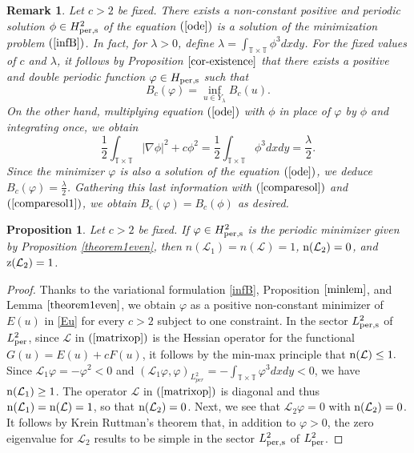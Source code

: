 \documentclass[12pt,reqno,a4paper]{amsart} %
\numberwithin{equation}{section}
\numberwithin{figure}{section}
\newtheorem{proposition}[theorem]{Proposition}
\newtheorem{remark}[theorem]{Remark}
\begin{document}
\begin{remark}\label{remark3} Let $c>2$ be fixed. There exists a non-constant positive and periodic solution $\phi\in H_{\rm per,s}^2$ of the equation $(\ref{ode})$ is a solution of the minimization problem $(\ref{infB})$. In fact, for $\lambda>0$, define $\lambda=\int_{\mathbb{T}\times\mathbb{T}}\phi^3dxdy$. For the fixed values of $c$ and $\lambda$, it follows by Proposition $\ref{cor-existence}$ that there exists a positive and double periodic function $\varphi\in H_{\rm per,s}$ such that 
	\begin{equation}\label{comparesol}
		B_{c}(\varphi)=\inf_{u\in Y_{\lambda}}B_c(u).
		\end{equation}
	On the other hand, multiplying equation $(\ref{ode})$ with $\phi$ in place of $\varphi$ by $\phi$ and integrating once, we obtain
	\begin{equation}\label{comparesol1}
		\frac{1}{2}\int_{\mathbb{T}\times\mathbb{T}}|\nabla \phi|^2+c\phi^2=\frac{1}{2}\int_{\mathbb{T}\times\mathbb{T}}\phi^3dxdy=\frac{\lambda}{2}.
		\end{equation}
		Since the minimizer $\varphi$ is also a solution of the equation $(\ref{ode})$, we deduce $B_{c}(\varphi)=\frac{\lambda}{2}$. Gathering this last information with $(\ref{comparesol})$ and $(\ref{comparesol1})$, we obtain $B_{c}(\varphi)=B_{c}(\phi)$ as desired.
\end{remark}

\begin{proposition}\label{simpleKernel2even}
	Let $c>2$ be fixed. If $\varphi \in H^2_{\rm per,s}$ is the periodic minimizer given by Proposition \ref{theorem1even}, then $n(\mathcal{L}_1)=n(\mathcal{L})=1$, ${\rm n}(\mathcal{L}_2)=0$, and  ${\rm z}(\mathcal{L}_2)=1$.
\end{proposition}

\begin{proof}Thanks to the variational formulation \eqref{infB}, Proposition $\ref{minlem}$, and Lemma $\ref{theorem1even}$,  we obtain $\varphi$ as a positive non-constant minimizer of $E(u)$ in \eqref{Eu} for every $c>2$ subject to one constraint. In the sector $L_{\rm per,s}^2$ of $L_{\rm per}^2$, since $\mathcal{L}$ in $(\ref{matrixop})$ is the Hessian operator for the functional $G(u)=E(u)+cF(u)$, it follows by the min-max principle \cite[Theorem XIII.2]{ReedSimon} that
	$
	{\rm n}(\mathcal{L}) \leq 1.
	$
	Since $\mathcal{L}_1\varphi=-\varphi^2<0$ and $(\mathcal{L}_1\varphi,\varphi)_{L^2_{per}}=-\int_{\mathbb{T}\times\mathbb{T}}\varphi^3dxdy<0$, we have ${\rm n}(\mathcal{L}_1) \geq 1$. The operator $\mathcal{L}$ in $(\ref{matrixop})$ is diagonal and thus ${\rm n}(\mathcal{L}_1)={\rm n}(\mathcal{L})=1$, so that ${\rm n}(\mathcal{L}_2)=0$. Next, we see that $\mathcal{L}_2\varphi=0$ with ${\rm n}(\mathcal{L}_2)=0$. It follows by Krein Ruttman's theorem that, in addition to 
	 $\varphi>0$, the zero eigenvalue for $\mathcal{L}_2$ results to be simple in the sector $L_{\rm per,s}^2$ of $L_{\rm per}^2$. 
\end{proof}
\end{document}
